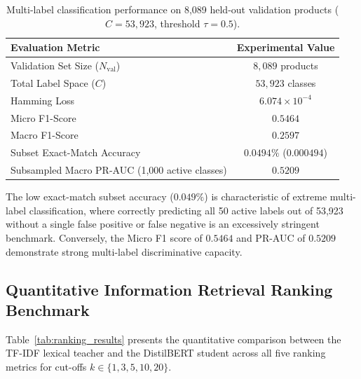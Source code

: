 \documentclass[11pt]{article}
\begin{document}
\begin{table}[ht]
  \centering
  \caption{Multi-label classification performance on 8,089 held-out validation products ($C = 53{,}923$, threshold $\tau = 0.5$).}
  \label{tab:class_metrics}
  \begin{tabular}{lc}
    \toprule
    \textbf{Evaluation Metric} & \textbf{Experimental Value} \\
    \midrule
    Validation Set Size ($N_{\text{val}}$) & $8{,}089$ products \\
    Total Label Space ($C$) & $53{,}923$ classes \\
    Hamming Loss & $6.074 \times 10^{-4}$ \\
    Micro F1-Score & $0.5464$ \\
    Macro F1-Score & $0.2597$ \\
    Subset Exact-Match Accuracy & $0.0494\%$ ($0.000494$) \\
    Subsampled Macro PR-AUC (1,000 active classes) & $0.5209$ \\
    \bottomrule
  \end{tabular}
\end{table}

The low exact-match subset accuracy ($0.049\%$) is characteristic of extreme multi-label classification, where correctly predicting all 50 active labels out of 53,923 without a single false positive or false negative is an excessively stringent benchmark. Conversely, the Micro F1 score of $0.5464$ and PR-AUC of $0.5209$ demonstrate strong multi-label discriminative capacity.

\subsection{Quantitative Information Retrieval Ranking Benchmark}
Table~\ref{tab:ranking_results} presents the quantitative comparison between the TF-IDF lexical teacher and the DistilBERT student across all five ranking metrics for cut-offs $k \in \{1, 3, 5, 10, 20\}$.
\end{document}

